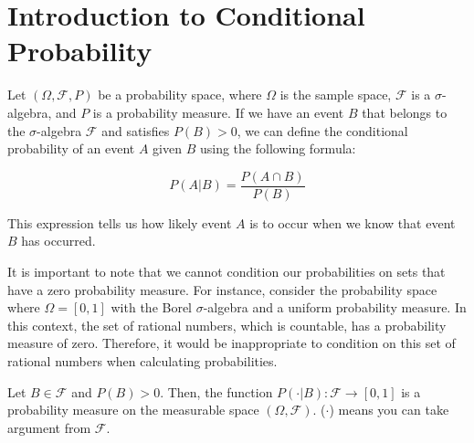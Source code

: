 \section{Introduction to Conditional Probability} 

\begin{definition}
    Let \((\Omega, \mathcal{F}, P)\) be a probability space, where \(\Omega\) is the sample space, \(\mathcal{F}\) is a \(\sigma\)-algebra, and \(P\) is a probability measure. If we have an event \(B\) that belongs to the \(\sigma\)-algebra \(\mathcal{F}\) and satisfies \(P(B) > 0\), we can define the conditional probability of an event \(A\) given \(B\) using the following formula:

\[
P(A|B) = \frac{P(A \cap B)}{P(B)}
\]

This expression tells us how likely event \(A\) is to occur when we know that event \(B\) has occurred. 
\end{definition}

It is important to note that we cannot condition our probabilities on sets that have a zero probability measure. For instance, consider the probability space where \(\Omega = [0, 1]\) with the Borel \(\sigma\)-algebra and a uniform probability measure. In this context, the set of rational numbers, which is countable, has a probability measure of zero. Therefore, it would be inappropriate to condition on this set of rational numbers when calculating probabilities.

\begin{theorem}
    Let \( B \in \mathcal{F} \) and \( P(B) > 0 \). Then, the function \( P(\cdot | B) : \mathcal{F} \to [0, 1] \) is a probability measure on the measurable space \( (\Omega, \mathcal{F}) \). ($\cdot$) means you can take argument from $\mathcal{F}$.
\end{theorem}

